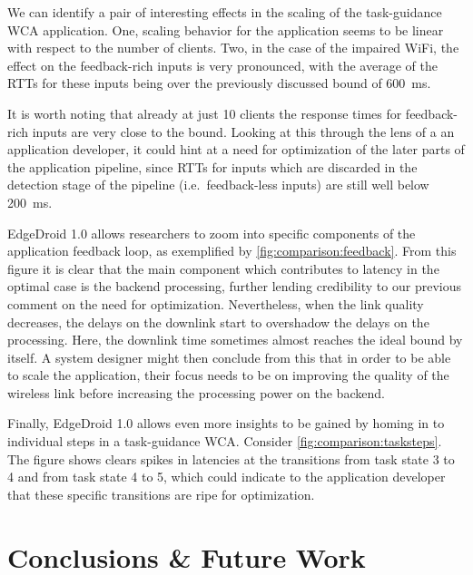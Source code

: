 We can identify a pair of interesting effects in the scaling of the task-guidance WCA application.
One, scaling behavior for the application seems to be linear with respect to the number of clients.
Two, in the case of the impaired WiFi, the effect on the feedback-rich inputs is very pronounced, with the average of the RTTs for these inputs being over the previously discussed bound of \SI{600}{\milli\second}.

It is worth noting that already at just 10 clients the response times for feedback-rich inputs are very close to the bound.
Looking at this through the lens of a an application developer, it could hint at a need for optimization of the later parts of the application pipeline, since RTTs for inputs which are discarded in the detection stage of the pipeline (i.e.\ feedback-less inputs) are still well below \SI{200}{\milli\second}.

EdgeDroid 1.0 allows researchers to zoom into specific components of the application feedback loop, as exemplified by \cref{fig:comparison:feedback}.
From this figure it is clear that the main component which contributes to latency in the optimal case is the backend processing, further lending credibility to our previous comment on the need for optimization.
Nevertheless, when the link quality decreases, the delays on the downlink start to overshadow the delays on the processing.
Here, the downlink time sometimes almost reaches the ideal bound by itself.
A system designer might then conclude from this that in order to be able to scale the application, their focus needs to be on improving the quality of the wireless link before increasing the processing power on the backend.

Finally, EdgeDroid 1.0 allows even more insights to be gained by homing in to individual steps in a task-guidance WCA. Consider \cref{fig:comparison:tasksteps}.
The figure shows clears spikes in latencies at the transitions from task state 3 to 4 and from task state 4 to 5, which could indicate to the application developer that these specific transitions are ripe for optimization.

\section{Conclusions \& Future Work}\label{sec:conclusions}

